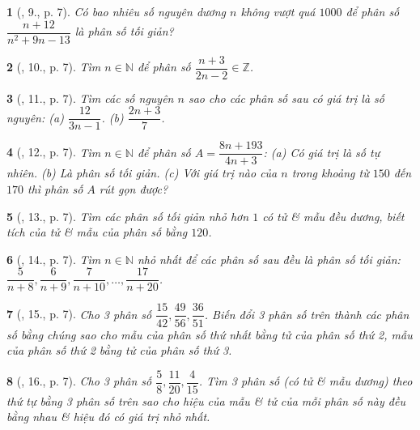 \documentclass{article}
\newtheorem{baitoan}{}
\begin{document}
\begin{baitoan}[\cite{Binh_Toan_6_tap_2}, 9., p. 7]
	Có bao nhiêu số nguyên dương $n$ không vượt quá $1000$ để phân số $\dfrac{n + 12}{n^2 + 9n - 13}$ là phân số tối giản?
\end{baitoan}

\begin{baitoan}[\cite{Binh_Toan_6_tap_2}, 10., p. 7]
	Tìm $n\in\mathbb{N}$ để phân số $\dfrac{n + 3}{2n - 2}\in\mathbb{Z}$.
\end{baitoan}

\begin{baitoan}[\cite{Binh_Toan_6_tap_2}, 11., p. 7]
	Tìm các số nguyên $n$ sao cho các phân số sau có giá trị là số nguyên: (a) $\dfrac{12}{3n - 1}$. (b) $\dfrac{2n + 3}{7}$.
\end{baitoan}

\begin{baitoan}[\cite{Binh_Toan_6_tap_2}, 12., p. 7]
	Tìm $n\in\mathbb{N}$ để phân số $A = \dfrac{8n + 193}{4n + 3}$: (a) Có giá trị là số tự nhiên. (b) Là phân số tối giản. (c) Với giá trị nào của $n$ trong khoảng từ $150$ đến $170$ thì phân số $A$ rút gọn được?
\end{baitoan}

\begin{baitoan}[\cite{Binh_Toan_6_tap_2}, 13., p. 7]
	Tìm các phân số tối giản nhỏ hơn $1$ có tử \& mẫu đều dương, biết tích của tử \& mẫu của phân số bằng $120$.
\end{baitoan}

\begin{baitoan}[\cite{Binh_Toan_6_tap_2}, 14., p. 7]
	Tìm $n\in\mathbb{N}$ nhỏ nhất để các phân số sau đều là phân số tối giản: $\dfrac{5}{n + 8},\dfrac{6}{n + 9},\dfrac{7}{n + 10},\ldots,\dfrac{17}{n + 20}$.
\end{baitoan}

\begin{baitoan}[\cite{Binh_Toan_6_tap_2}, 15., p. 7]
	Cho 3 phân số $\dfrac{15}{42},\dfrac{49}{56},\dfrac{36}{51}$. Biến đổi 3 phân số trên thành các phân số bằng chúng sao cho mẫu của phân số thứ nhất bằng tử của phân số thứ 2, mẫu của phân số thứ 2 bằng tử của phân số thứ 3.
\end{baitoan}

\begin{baitoan}[\cite{Binh_Toan_6_tap_2}, 16., p. 7]
	Cho 3 phân số $\dfrac{5}{8},\dfrac{11}{20},\dfrac{4}{15}$. Tìm 3 phân số (có tử \& mẫu dương) theo thứ tự bằng 3 phân số trên sao cho hiệu của mẫu \& tử của mỗi phân số này đều bằng nhau \& hiệu đó có giá trị nhỏ nhất.
\end{baitoan}
\end{document}
